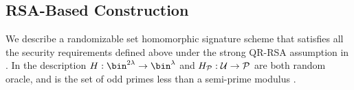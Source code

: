 


\subsection{RSA-Based Construction}

We describe a randomizable set homomorphic signature scheme 
that satisfies all the security requirements defined above
under the strong QR-RSA assumption in . In the description $\ro: \bin^{2\secParam} \rightarrow \bin^{\secParam}$ and $H_{\mathcal{P}}: \mathcal{U} \rightarrow \mathcal{P}$  are both random oracle, and \primes is the set of odd primes less than a semi-prime modulus \rsaMod.

